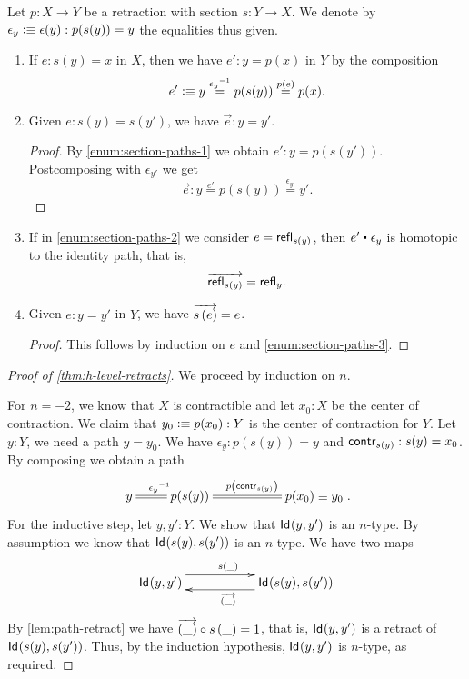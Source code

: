 \begin{lem}\label{lem:path-retract}
 Let $p \colon X \to Y$ be a retraction with section $s \colon Y \to X$.
 We denote by $\epsilon_y \defeq \epsilon(y) : p(s(y)) = y$ the equalities thus given.
 \begin{enumerate}
  \item \label{enum:section-paths-1}
      If $e : s(y) = x$ in $X$, then we have $e' :  y = p(x)$ in $Y$
        by the composition
     \[e' \defeq y \stackrel{\opp{\epsilon_y}}{=} p(s(y)) \stackrel{\map{p}{e}}{=} p(x).\]
  \item \label{enum:section-paths-2}
      Given $e : s(y) = s(y')$, we have $\vec e : y = y'$.
     \begin{proof}
        By \ref{enum:section-paths-1} we obtain $e' : y = p(s(y'))$.
        Postcomposing with $\epsilon_{y'}$ we get
           \[ \overrightarrow{e} : y \stackrel{e'}{=} p(s(y)) \stackrel{\epsilon_{y'}}{=} y'  . \]
     \end{proof}
  \item \label{enum:section-paths-3}
        If in \ref{enum:section-paths-2} we consider $e = \refl{s(y)}$, then $e' \ct \epsilon_{y}$
        is homotopic to the identity path, that is,
          \[ \overrightarrow{\refl{s(y)}} = \refl{y}  . \]
  \item Given $e : y = y'$ in $Y$, we have $\overrightarrow{\map{s}{e}} = e$.
      \begin{proof}
       This follows by induction on $e$ and \ref{enum:section-paths-3}.
      \end{proof}
 \end{enumerate}

\end{lem}


\begin{proof}[Proof of \autoref{thm:h-level-retracts}]
 We proceed by induction on $n$.

 For $n=-2$, we know that $X$ is contractible and let $x_0 : X$ be the center of contraction.
 We claim that $y_0 \defeq p(x_0) : Y$ is the center of contraction for $Y$.
 Let $y : Y$, we need a path $y = y_0$. We have $\epsilon_y : p(s(y)) = y$ and $\contr_{s(y)} : s(y) = x_0$.
 By composing we obtain a path
 \[\xymatrix { y \ar@{=}[r]^{\opp{\epsilon_y}} & p(s(y)) \ar@{=}[rr]^{\map{p}{\contr_{s(y)}}} && p(x_0) \equiv y_0 } . \]
 For the inductive step, let $y, y' : Y$. We show that $\idtype {y}{y'}$ is an $n$-type.
 By assumption we know that $\idtype{s(y)}{s(y')}$ is an $n$-type.
 We have two maps
 \[\xymatrix{\idtype{y}{y'} \ar@<1.5ex>[rr]^{\map{s}{\_}} & & \idtype{s(y)}{s(y')} \ar@<1.2ex>[ll]^{\overrightarrow{(\_)}}}\]
  By \autoref{lem:path-retract} we have $\comp{\map{s}{\_}}{\overrightarrow{(\_)}} = 1$,
   that is, $\idtype {y}{y'}$ is a retract of $\idtype{s(y)}{s(y')}$.
    Thus, by the induction hypothesis, $\idtype {y}{y'}$ is $n$-type, as required.
\end{proof}

